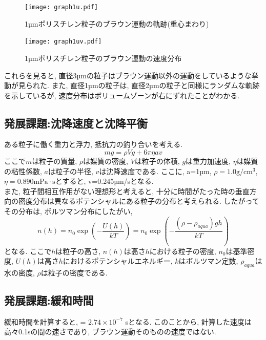 \documentclass[11pt]{ltjsarticle}
\begin{document}
      \begin{minipage}{0.48\textwidth}
        \begin{figure}[H]
          \centering
          \texttt{[image: graph1u.pdf]}
          \caption{1µmポリスチレン粒子のブラウン運動の軌跡(重心まわり)}
          \label{fig:1ps_track}
        \end{figure}
      \end{minipage}
      \hfill
      \begin{minipage}{0.48\textwidth}
        \begin{figure}[H]
          \centering
          \texttt{[image: graph1uv.pdf]}
          \caption{1µmポリスチレン粒子のブラウン運動の速度分布}
          \label{fig:1ps_speed}
        \end{figure}
      \end{minipage}
      これらを見ると, 直径3µmの粒子はブラウン運動以外の運動をしているような挙動が見られた. また, 直径1µmの粒子は, 直径2µmの粒子と同様にランダムな軌跡を示しているが, 速度分布はボリュームゾーンが右にずれたことがわかる.\\
    \subsection*{発展課題:沈降速度と沈降平衡}
      ある粒子に働く重力と浮力, 抵抗力の釣り合いを考える.
      \begin{equation}
        mg = \rho V g + 6 \pi \eta a v
        \label{eq:stokes}
      \end{equation}
      ここで$m$は粒子の質量, $\rho$は媒質の密度, $V$は粒子の体積, $g$は重力加速度, $\eta$は媒質の粘性係数, $a$は粒子の半径, $v$は沈降速度である.
      ここに, a=1µm, $\rho=1.0 \mathrm{g/cm^3}$, $\eta=0.890 \mathrm{mPa\cdot s}$とすると,
      v=0.245µm/sとなる.\\
      また, 粒子間相互作用がない理想形と考えると, 十分に時間がたった時の垂直方向の密度分布は異なるポテンシャルにある粒子の分布と考えられる.
      したがってその分布は, ボルツマン分布にしたがい,
      \begin{equation}
        n(h)= n_0 \exp\left(-\frac{U(h)}{kT}\right) = n_0 \exp\left(-\frac{(\rho-\rho_{aqua})gh}{kT}\right)
        \label{eq:boltzmann}
      \end{equation}
      となる. ここで$h$は粒子の高さ, $n(h)$は高さ$h$における粒子の密度, $n_0$は基準密度, $U(h)$は高さ$h$におけるポテンシャルエネルギー, $k$はボルツマン定数, $\rho_{aqua}$は水の密度, $\rho$は粒子の密度である.
    \subsection*{発展課題:緩和時間}
      緩和時間を計算すると, \tau = $2.74 \times 10^{-7}$ sとなる. このことから, 計算した速度は高々0.1sの間の速さであり, ブラウン運動そのものの速度ではない. 
\end{document}

